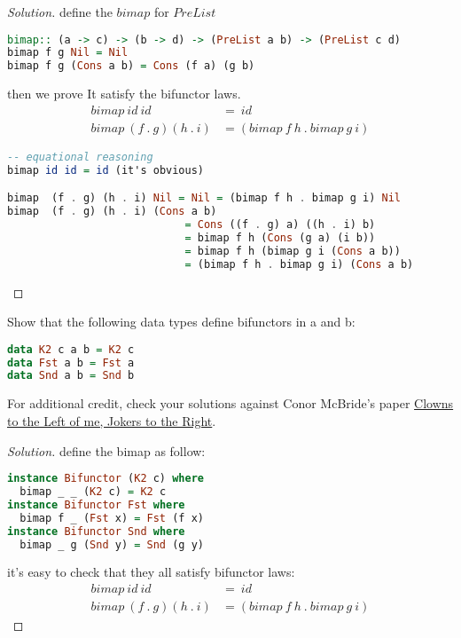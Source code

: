 \documentclass[7x10,thmnumcontwithchapter,WebLink,AddlevelTwoTOC,NumRef,BookEndNote,printer]{pupbook}
\begin{document}
\begin{proof}[Solution]
define the $bimap$ for $PreList$
\begin{lstlisting}[language=Haskell]
bimap:: (a -> c) -> (b -> d) -> (PreList a b) -> (PreList c d)
bimap f g Nil = Nil
bimap f g (Cons a b) = Cons (f a) (g b)
\end{lstlisting}
then we prove It satisfy the bifunctor laws.
\begin{align*}
	 bimap \ id \ id \ &= \ id  \\     
	 bimap \ (f \ . \ g) (h \ . \ i) &= (bimap \ f \ h \ . \ bimap \ g \ i)
\end{align*}
\begin{lstlisting}[language=Haskell]
-- equational reasoning
bimap id id = id (it's obvious)

bimap  (f . g) (h . i) Nil = Nil = (bimap f h . bimap g i) Nil
bimap  (f . g) (h . i) (Cons a b) 
                            = Cons ((f . g) a) ((h . i) b) 
                            = bimap f h (Cons (g a) (i b))
                            = bimap f h (bimap g i (Cons a b))
                            = (bimap f h . bimap g i) (Cons a b)
\end{lstlisting}

\end{proof}


\begin{exercise}
Show that the following data types define bifunctors in a and b:
\begin{lstlisting}[language=Haskell]
data K2 c a b = K2 c
data Fst a b = Fst a
data Snd a b = Snd b
\end{lstlisting}
For additional credit, check your solutions against Conor McBride’s paper  \href{http://strictlypositive.org/CJ.pdf}{Clowns to the Left of me, Jokers to the Right}.
\end{exercise}


\begin{proof}[Solution]
define the bimap as follow:
\begin{lstlisting}[language=Haskell]
instance Bifunctor (K2 c) where
  bimap _ _ (K2 c) = K2 c
instance Bifunctor Fst where 
  bimap f _ (Fst x) = Fst (f x)
instance Bifunctor Snd where
  bimap _ g (Snd y) = Snd (g y)
\end{lstlisting}
 it's easy to check that they all satisfy bifunctor laws:	
\begin{align*}
bimap \ id \ id \ &= \ id  \\     
bimap \ (f \ . \ g) (h \ . \ i) &= (bimap \ f \ h \ . \ bimap \ g \ i)
\end{align*}
\end{proof}
\end{document}
